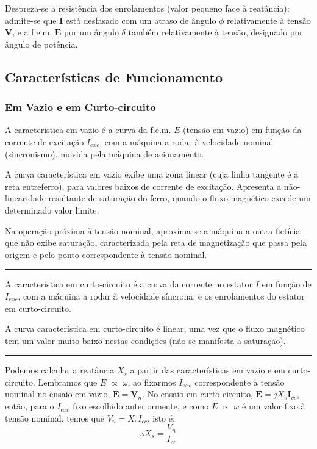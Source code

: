 \noindent Despreza-se a resistência dos enrolamentos (valor pequeno face à reatância); admite-se que $\mathbf{I}$ está desfasado com um atraso de ângulo $\phi$ relativamente à tensão $\mathbf{V}$, e a f.e.m. $\mathbf{E}$ por um ângulo $\delta$ também relativamente à tensão, designado por ângulo de potência.

\subsection{Características de Funcionamento}
\subsubsection{Em Vazio e em Curto-circuito}

A característica em vazio é a curva da f.e.m. $E$ (tensão em vazio) em função da corrente de excitação $I_{exc}$, com a máquina a rodar à velocidade nominal (sincronismo), movida pela máquina de acionamento.

A curva característica em vazio exibe uma zona linear (cuja linha tangente é a reta entreferro), para valores baixos de corrente de excitação. Apresenta a não-linearidade resultante de saturação do ferro, quando o fluxo magnético excede um determinado valor limite.

Na operação próxima à tensão nominal, aproxima-se a máquina a outra fictícia que não exibe saturação, caracterizada pela reta de magnetização que passa pela origem e pelo ponto correspondente à tensão nominal.

\vspace{1em}\hrule\vspace{1em}

\noindent A característica em curto-circuito é a curva da corrente no estator $I$ em função de $I_{exc}$, com a máquina a rodar à velocidade síncrona, e os enrolamentos do estator em curto-circuito.

A curva característica em curto-circuito é linear, uma vez que o fluxo magnético tem um valor muito baixo nestas condições (não se manifesta a saturação).

\vspace{1em}\hrule\vspace{1em}

\noindent Podemos calcular a reatância $X_s$ a partir das características em vazio e em curto-circuito. Lembramos que $E \;\propto\; \omega$, ao fixarmos $I_{exc}$ correspondente à tensão nominal no ensaio em vazio, $\mathbf{E}=\mathbf{V}_n$. No ensaio em curto-circuito, $\mathbf{E}=jX_s \mathbf{I}_{cc}$, então, para o $I_{exc}$ fixo escolhido anteriormente, e como $E \;\propto\; \omega$ é um valor fixo à tensão nominal, temos que $V_n = X_s I_{cc}$, isto é:
$$
    \therefore X_s = \frac{V_n}{I_{cc}}
$$

